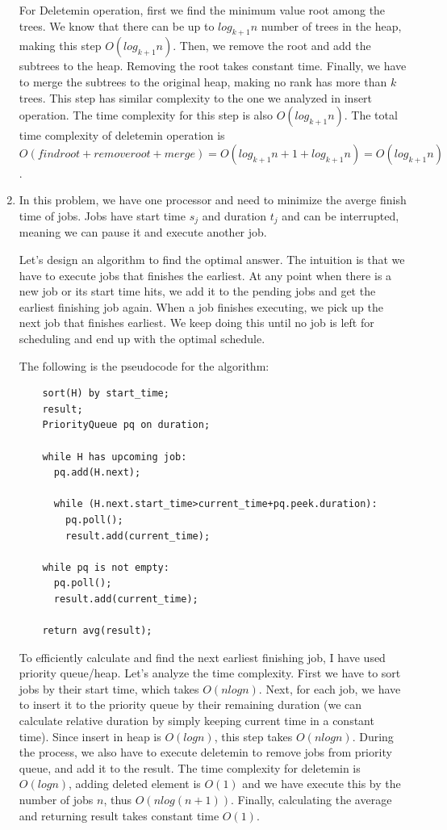 \documentclass{article}
\begin{document}
\begin{enumerate}
  For Deletemin operation, first we find the minimum value root among the trees.
  We know that there can be up to $log_{k+1}n$ number of trees in the heap, making this step $O(log_{k+1}n)$.
  Then, we remove the root and add the subtrees to the heap.
  Removing the root takes constant time.
  Finally, we have to merge the subtrees to the original heap, making no rank has more than $k$ trees.
  This step has similar complexity to the one we analyzed in insert operation.
  The time complexity for this step is also $O(log_{k+1}n)$.
  The total time complexity of deletemin operation is $O(findroot+removeroot+merge)=O(log_{k+1}n+1+log_{k+1}n)=O(log_{k+1}n)$.

  \item In this problem, we have one processor and need to minimize the averge finish time of jobs.
  Jobs have start time $s_j$ and duration $t_j$ and can be interrupted, meaning we can pause it and execute another job.

  Let's design an algorithm to find the optimal answer.
  The intuition is that we have to execute jobs that finishes the earliest.
  At any point when there is a new job or its start time hits, we add it to the pending jobs and get the earliest finishing job again.
  When a job finishes executing, we pick up the next job that finishes earliest.
  We keep doing this until no job is left for scheduling and end up with the optimal schedule.

  The following is the pseudocode for the algorithm:

  \begin{lstlisting}
    sort(H) by start_time;
    result;
    PriorityQueue pq on duration;
    
    while H has upcoming job:
      pq.add(H.next);
      
      while (H.next.start_time>current_time+pq.peek.duration):
        pq.poll();
        result.add(current_time);
    
    while pq is not empty:
      pq.poll();
      result.add(current_time);
    
    return avg(result);

  \end{lstlisting}

  To efficiently calculate and find the next earliest finishing job, I have used priority queue/heap.
  Let's analyze the time complexity.
  First we have to sort jobs by their start time, which takes $O(nlogn)$.
  Next, for each job, we have to insert it to the priority queue by their remaining duration (we can calculate relative duration by simply keeping current time in a constant time).
  Since insert in heap is $O(logn)$, this step takes $O(nlogn)$.
  During the process, we also have to execute deletemin to remove jobs from priority queue, and add it to the result.
  The time complexity for deletemin is $O(logn)$, adding deleted element is $O(1)$ and we have execute this by the number of jobs $n$, thus $O(nlog(n+1))$.
  Finally, calculating the average and returning result takes constant time $O(1)$.


\end{enumerate}
\end{document}
